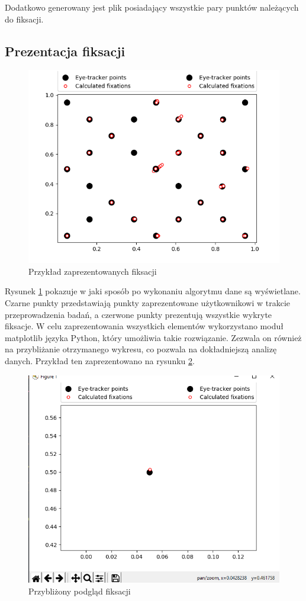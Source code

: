 Dodatkowo generowany jest plik posiadający wszystkie pary punktów należących do fiksacji.
\subsection{Prezentacja fiksacji}
\label{ssec:fixations}
\begin{figure}[H]
        \centering
        \captionsetup{justification=centering,margin=2cm}
        \includegraphics[width=0.8\linewidth]{resources/calculated_fixations.png}
        \caption{Przykład zaprezentowanych fiksacji}
        \label{fig:presentationfixation}
\end{figure}
Rysunek \ref{fig:presentationfixation} pokazuje w jaki sposób po wykonaniu algorytmu dane są wyświetlane. Czarne punkty przedstawiają punkty zaprezentowane użytkownikowi w trakcie przeprowadzenia badań, a czerwone punkty prezentują wszystkie wykryte fiksacje. W celu zaprezentowania wszystkich elementów wykorzystano moduł matplotlib języka Python, który umożliwia takie rozwiązanie. Zezwala on również na przybliżanie otrzymanego wykresu, co pozwala na dokładniejszą analizę danych. Przykład ten zaprezentowano na rysunku \ref{fig:zoomedfixation}.
\begin{figure}[H]
        \centering
        \captionsetup{justification=centering,margin=2cm}
        \includegraphics[width=0.8\linewidth]{resources/zoomed_fixation.png}
        \caption{Przybliżony podgląd fiksacji}
        \label{fig:zoomedfixation}
\end{figure}
